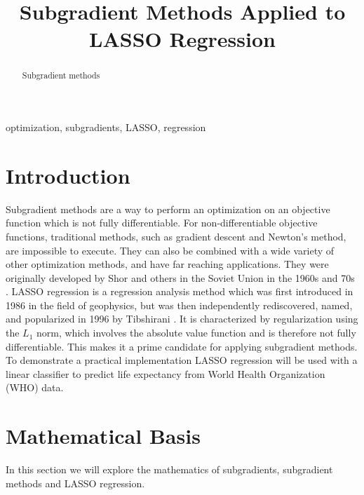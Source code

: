 \documentclass[conference]{IEEEtran}
\begin{document}
\title{
Subgradient Methods Applied to LASSO Regression
}

\author{
}


\maketitle

\begin{abstract}
Subgradient methods
\end{abstract}

\begin{IEEEkeywords}
optimization, subgradients, LASSO, regression
\end{IEEEkeywords}

\section{Introduction}\label{sec:intro}
Subgradient methods are a way to perform an optimization on an objective function which is not fully differentiable. For non-differentiable objective functions, traditional methods, such as gradient descent and Newton's method, are impossible to execute. They can also be combined with a wide variety of other optimization methods, and have far reaching applications. They were originally developed by Shor and others in the Soviet Union in the 1960s and 70s \cite{boydparksubgradients} \cite{boydxiaosubgradients}. LASSO regression is a regression analysis method which was first introduced in 1986 \cite{lassooriginal} in the field of geophysics, but was then independently rediscovered, named, and popularized in 1996 by Tibshirani \cite{lassopaper}. It is characterized by regularization using the \(L_1\) norm, which involves the absolute value function and is therefore not fully differentiable. This makes it a prime candidate for applying subgradient methods. To demonstrate a practical implementation LASSO regression will be used with a linear classifier to predict life expectancy from World Health Organization (WHO) data.


\section{Mathematical Basis}\label{sec:math}
In this section we will explore the mathematics of subgradients, subgradient methods and LASSO regression.
\end{document}
